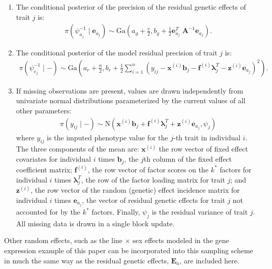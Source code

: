 \documentclass[12pt,titlepage]{article}
\begin{document}
\begin{enumerate}
\item The conditional posterior of the precision of the residual genetic effects of trait $j$ is:
\begin{align*}
\pi(\psi^{-1}_{a_j}\mid \mathbf{e}_{a_j}) \sim \mbox{Ga}\left(a_g + \frac{r}{2},b_g + \frac{1}{2} \mathbf{e}^T_{a_j}\;\mathbf{A}^{-1} \mathbf{e}_{a_j}\right).
\end{align*}

\item The conditional posterior of the model residual precision of trait $j$ is:
\begin{align*}
\pi(\psi^{-1}_{e_j}\mid -) \sim \mbox{Ga}\left(a_r + \frac{n}{2},b_r + \frac{1}{2}\sum\limits_{i=1}^n \left(y_{ij}-\mathbf{x}^{(i)}\mathbf{b}_j - \mathbf{f}^{(i)}\pmb{\lambda}^T_j - \mathbf{z}^{(i)}\mathbf{e}_{a_j}\right)^2\right).
\end{align*}


\item If missing observations are present, values are drawn independently from univariate normal distributions parameterized by the current values of all other parameters:
\begin{align*}
\pi(y_{ij}\mid - ) \sim \mbox{N}\left(\mathbf{x}^{(i)}\mathbf{b}_j + \mathbf{f}^{(i)}\pmb{\lambda}^T_j + \mathbf{z}^{(i)}\mathbf{e}_{a_j},\psi_j\right)
\end{align*} 
\noindent where $y_{ij}$ is the imputed phenotype value for the $j$-th trait in individual $i$. The three components of the mean are: $\mathbf{x}^{(i)}$ the row vector of fixed effect covariates for individual $i$ times $\mathbf{b}_j$, the $j$th column of the fixed effect coefficient matrix; $\mathbf{f}^{(i)}$, the row vector of factor scores on the $k^*$ factors for individual $i$ times  $\pmb \lambda^T_j$, the row of the factor loading matrix for trait $j$; and $\mathbf{z}^{(i)}$, the row vector of the random (genetic) effect incidence matrix for individual $i$ times  $\mathbf{e}_{a_j}$, the vector of residual genetic effects for trait $j$ not accounted for by the $k^*$ factors. Finally, $\psi_j$ is the residual variance of trait $j$. All missing data is drawn in a single block update.

\end{enumerate}


Other random effects, such as the line $\times$ sex effects modeled in the gene expression example of this paper can be incorporated into this sampling scheme in much the same way as the residual genetic effects, $\mathbf{E}_a$, are included here.
\end{document}
